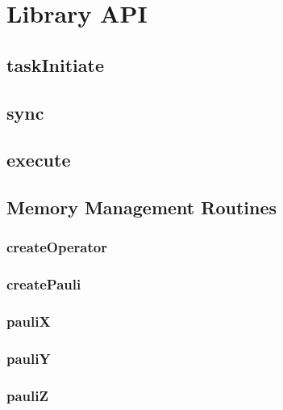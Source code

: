 \documentclass[10pt]{book}
\begin{document}
\section{\qcor Library API}\label{sec:qcor_library_api}
\subsection{\textbf{taskInitiate}}\label{subsec:taskInitiate}


\subsection{\textbf{sync}}\label{subsec:sync}


\subsection{\textbf{execute}}\label{subsec:execute}



\subsection{Memory Management Routines}
\subsubsection{\textbf{createOperator}}\label{subsec:createop}


\subsubsection{\textbf{createPauli}}\label{subsec:createpauli}


\subsubsection{\textbf{pauliX}}\label{subsec:paulix}


\subsubsection{\textbf{pauliY}}\label{subsec:pauliy}


\subsubsection{\textbf{pauliZ}}\label{subsec:pauliz}

\end{document}
